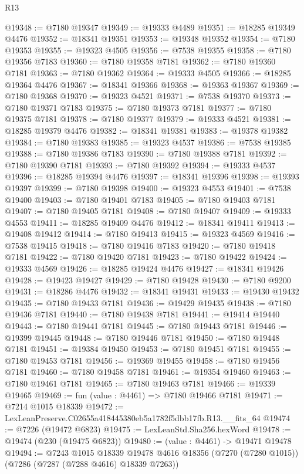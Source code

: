 \begin{lexlean}{R13}
\begin{coremodule}
@19348 := @7180 @19347
@19349 := @19333 @4489
@19351 := @18285 @19349 @4476
@19352 := @18341 @19351
@19353 := @19348 @19352
@19354 := @7180 @19353
@19355 := @19323 @4505
@19356 := @7538 @19355
@19358 := @7180 @19356 @7183
@19360 := @7180 @19358 @7181
@19362 := @7180 @19360 @7181
@19363 := @7180 @19362
@19364 := @19333 @4505
@19366 := @18285 @19364 @4476
@19367 := @18341 @19366
@19368 := @19363 @19367
@19369 := @7180 @19368
@19370 := @19323 @4521
@19371 := @7538 @19370
@19373 := @7180 @19371 @7183
@19375 := @7180 @19373 @7181
@19377 := @7180 @19375 @7181
@19378 := @7180 @19377
@19379 := @19333 @4521
@19381 := @18285 @19379 @4476
@19382 := @18341 @19381
@19383 := @19378 @19382
@19384 := @7180 @19383
@19385 := @19323 @4537
@19386 := @7538 @19385
@19388 := @7180 @19386 @7183
@19390 := @7180 @19388 @7181
@19392 := @7180 @19390 @7181
@19393 := @7180 @19392
@19394 := @19333 @4537
@19396 := @18285 @19394 @4476
@19397 := @18341 @19396
@19398 := @19393 @19397
@19399 := @7180 @19398
@19400 := @19323 @4553
@19401 := @7538 @19400
@19403 := @7180 @19401 @7183
@19405 := @7180 @19403 @7181
@19407 := @7180 @19405 @7181
@19408 := @7180 @19407
@19409 := @19333 @4553
@19411 := @18285 @19409 @4476
@19412 := @18341 @19411
@19413 := @19408 @19412
@19414 := @7180 @19413
@19415 := @19323 @4569
@19416 := @7538 @19415
@19418 := @7180 @19416 @7183
@19420 := @7180 @19418 @7181
@19422 := @7180 @19420 @7181
@19423 := @7180 @19422
@19424 := @19333 @4569
@19426 := @18285 @19424 @4476
@19427 := @18341 @19426
@19428 := @19423 @19427
@19429 := @7180 @19428
@19430 := @7180 @9200
@19431 := @18286 @4476
@19432 := @18341 @19431
@19433 := @19430 @19432
@19435 := @7180 @19433 @7181
@19436 := @19429 @19435
@19438 := @7180 @19436 @7181
@19440 := @7180 @19438 @7181
@19441 := @19414 @19440
@19443 := @7180 @19441 @7181
@19445 := @7180 @19443 @7181
@19446 := @19399 @19445
@19448 := @7180 @19446 @7181
@19450 := @7180 @19448 @7181
@19451 := @19384 @19450
@19453 := @7180 @19451 @7181
@19455 := @7180 @19453 @7181
@19456 := @19369 @19455
@19458 := @7180 @19456 @7181
@19460 := @7180 @19458 @7181
@19461 := @19354 @19460
@19463 := @7180 @19461 @7181
@19465 := @7180 @19463 @7181
@19466 := @19339 @19465
@19469 := fun (value : @4461) => @7180 @19466 @7181
@19471 := @7214 @1015 @18339
@19472 := LexLeanPreserve.C02655a418445380eb5a1782f5dbb17fb.R13.__fits_64
@19474 := @7226 (@19472 @6823)
@19475 := LexLeanStd.Sha256.hexWord
@19478 := @19474 (@230 (@19475 @6823))
@19480 := (value : @4461) -> @19471 @19478
@19494 := @7243
    @1015
    @18339
    @19478
    @4616
    @18356
    (@7270 (@7280 @1015))
    (@7286 (@7287 (@7288 @4616) @18339 @7263))

\end{coremodule}
\end{lexlean}
